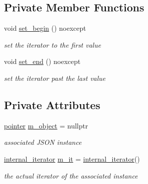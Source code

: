 \subsection*{Private Member Functions}
\begin{DoxyCompactItemize}
\item 
void \hyperlink{classnlohmann_1_1basic__json_1_1const__iterator_a3b622b4566be0737cdb0ade15737db89}{set\+\_\+begin} () noexcept
\begin{DoxyCompactList}\small\item\em set the iterator to the first value \end{DoxyCompactList}\item 
void \hyperlink{classnlohmann_1_1basic__json_1_1const__iterator_a149e876bd288ceb1536e27a7f8b3b8fd}{set\+\_\+end} () noexcept
\begin{DoxyCompactList}\small\item\em set the iterator past the last value \end{DoxyCompactList}\end{DoxyCompactItemize}
\subsection*{Private Attributes}
\begin{DoxyCompactItemize}
\item 
\hypertarget{classnlohmann_1_1basic__json_1_1const__iterator_a85ae02177817f5899dbfe5778c63bd13}{}\label{classnlohmann_1_1basic__json_1_1const__iterator_a85ae02177817f5899dbfe5778c63bd13} 
\hyperlink{classnlohmann_1_1basic__json_1_1const__iterator_a1da96fc3054d547e7706d3a2f073f389}{pointer} \hyperlink{classnlohmann_1_1basic__json_1_1const__iterator_a85ae02177817f5899dbfe5778c63bd13}{m\+\_\+object} = nullptr
\begin{DoxyCompactList}\small\item\em associated J\+S\+ON instance \end{DoxyCompactList}\item 
\hypertarget{classnlohmann_1_1basic__json_1_1const__iterator_afa144654205de166508c7cc015231254}{}\label{classnlohmann_1_1basic__json_1_1const__iterator_afa144654205de166508c7cc015231254} 
\hyperlink{structnlohmann_1_1basic__json_1_1internal__iterator}{internal\+\_\+iterator} \hyperlink{classnlohmann_1_1basic__json_1_1const__iterator_afa144654205de166508c7cc015231254}{m\+\_\+it} = \hyperlink{structnlohmann_1_1basic__json_1_1internal__iterator}{internal\+\_\+iterator}()
\begin{DoxyCompactList}\small\item\em the actual iterator of the associated instance \end{DoxyCompactList}\end{DoxyCompactItemize}
